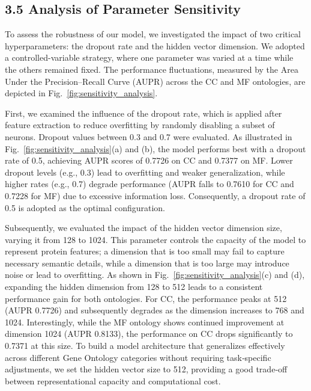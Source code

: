 \documentclass[unnumsec,webpdf,contemporary,large]{oup-authoring-template}%
\theoremstyle{thmstyleone}%
\theoremstyle{thmstyletwo}%
\theoremstyle{thmstylethree}%
\begin{document}
\subsection{3.5 Analysis of Parameter Sensitivity}
To assess the robustness of our model, we investigated the impact of two critical hyperparameters: the dropout rate and the hidden vector dimension. We adopted a controlled-variable strategy, where one parameter was varied at a time while the others remained fixed. The performance fluctuations, measured by the Area Under the Precision–Recall Curve (AUPR) across the CC and MF ontologies, are depicted in Fig.~\ref{fig:sensitivity_analysis}.

First, we examined the influence of the dropout rate, which is applied after feature extraction to reduce overfitting by randomly disabling a subset of neurons. Dropout values between 0.3 and 0.7 were evaluated. As illustrated in Fig.~\ref{fig:sensitivity_analysis}(a) and (b), the model performs best with a dropout rate of 0.5, achieving AUPR scores of 0.7726 on CC and 0.7377 on MF. Lower dropout levels (e.g., 0.3) lead to overfitting and weaker generalization, while higher rates (e.g., 0.7) degrade performance (AUPR falls to 0.7610 for CC and 0.7228 for MF) due to excessive information loss. Consequently, a dropout rate of 0.5 is adopted as the optimal configuration.

Subsequently, we evaluated the impact of the hidden vector dimension size, varying it from 128 to 1024. This parameter controls the capacity of the model to represent protein features; a dimension that is too small may fail to capture necessary semantic details, while a dimension that is too large may introduce noise or lead to overfitting. As shown in Fig.~\ref{fig:sensitivity_analysis}(c) and (d), expanding the hidden dimension from 128 to 512 leads to a consistent performance gain for both ontologies. For CC, the performance peaks at 512 (AUPR 0.7726) and subsequently degrades as the dimension increases to 768 and 1024. Interestingly, while the MF ontology shows continued improvement at dimension 1024 (AUPR 0.8133), the performance on CC drops significantly to 0.7371 at this size. To build a model architecture that generalizes effectively across different Gene Ontology categories without requiring task‑specific adjustments, we set the hidden vector size to 512, providing a good trade‑off between representational capacity and computational cost.
\end{document}
